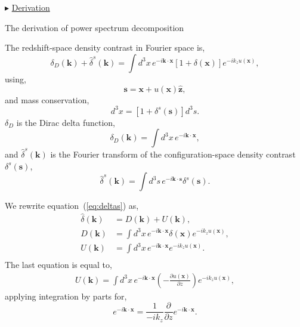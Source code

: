 \documentclass[a4paper,11pt, fleqn]{article}
\begin{document}
\vspace{10mm}
$\blacktriangleright$ \hyperlink{link:decomposed-power-derivation}{Derivation}

%
\newpage
\hypertarget{link:decomposed-power-derivation}{The derivation of power spectrum decomposition}

\vspace{10mm}
The redshift-space density contrast in Fourier space is,
%
\begin{equation}
  \label{eq:deltas}
  \delta_D(\bm{k}) + \hat{\delta}^s(\bm{k}) = \int \! d^3 x \, e^{-i\bm{k}\cdot\bm{x}} [1 + \delta(\bm{x})] e^{-ik_z u(\bm{x})},
\end{equation}
%
using,
%
\begin{equation}
  \bm{s} = \bm{x} + u(\bm{x}) \hat{\bm{z}},
\end{equation}
%
and mass conservation,
%
\begin{equation}
  [1 + \delta(\bm{x})] d^3 x = [1 + \delta^s(\bm{s})] d^3 s.
\end{equation}
%
$\delta_D$ is the Dirac delta function,
%
\begin{equation}
  \delta_D(\bm{k}) = \int\! d^3 x \, e^{-i\bm{k}\cdot\bm{x}},
\end{equation}
and $\hat{\delta}^s(\bm{k})$ is the Fourier transform of the
configuration-space density contrast $\delta^s(\bm{s})$,
%
\begin{equation}
  \hat{\delta}^s(\bm{k}) = \int \! d^3 s \,
                           e^{-i\bm{k}\cdot\bm{s}} \delta^s(\bm{s}).
\end{equation}

\vspace{10mm}
We rewrite equation~(\ref{eq:deltas}) as,
%
\begin{align}
  \hat{\delta}(\bm{k}) &= D(\bm{k}) + U(\bm{k}),\\
  D(\bm{k}) &= \int \! d^3 x \, e^{-i\bm{k}\cdot\bm{x}} \delta(\bm{x})
               e^{-ik_z u(\bm{x})},\\
  U(\bm{k}) &= \int \! d^3 x \, e^{-i\bm{k}\cdot\bm{x}}
                              e^{-ik_z u(\bm{x})}.\\
\end{align}
%
The last equation is equal to,
%
\begin{equation}\begin{split}
  U(\bm{k}) = \int\! d^3 x \, e^{-i \bm{k}\cdot\bm{x}}
              \left( - \frac{\partial u(\bm{x})}{\partial z} \right)
              e^{-ik_z u(\bm{x})},
\end{split}\end{equation}
applying integration by parts for,
\begin{equation}
  e^{-i \bm{k}\cdot\bm{x}} = \frac{1}{-ik_z}
  \frac{\partial}{\partial z} e^{-i \bm{k}\cdot\bm{x}}.
\end{equation}
\end{document}
